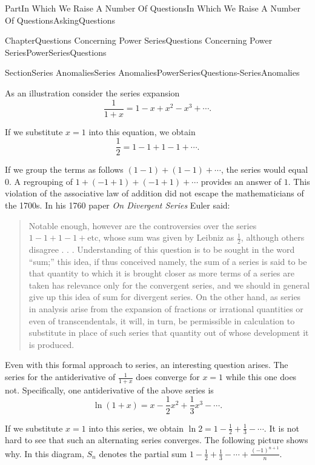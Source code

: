 \documentclass[oneside,10pt,]{book}
\newcommand{\pubtitle}[1]{\textsl{#1}}
\numberwithin{equation}{part}
\begin{document}
\begin{partptx}{Part}{In Which We Raise A Number Of Questions}{}{In Which We Raise A Number Of Questions}{}{}{AskingQuestions}
\begin{chapterptx}{Chapter}{Questions Concerning Power Series}{}{Questions Concerning Power Series}{}{}{PowerSeriesQuestions}
\begin{sectionptx}{Section}{Series Anomalies}{}{Series Anomalies}{}{}{PowerSeriesQuestions-SeriesAnomalies}
\par
As an illustration consider the series expansion%
\begin{equation*}
\frac{1}{1+x}=1-x+x^2-x^3+\cdots\text{.}
\end{equation*}
%
\par
If we substitute \(x=1\) into this equation, we obtain%
\begin{equation*}
\frac{1}{2}=1-1+1-1+\cdots\text{.}
\end{equation*}
%
\par
If we group the terms as follows \((1-1)+(1-1)+\cdots\), the series would equal \(0\).  A regrouping of \(1+(-1+1)+(-1+1)+\cdots\) provides an answer of \(1\). This violation of the associative law of addition did not escape the mathematicians of the 1700s.  In his 1760 paper \pubtitle{On Divergent Series} Euler said:%
\begin{quote}%
 Notable enough, however are the controversies over the series \(1-1+1-1+\text{etc}\), whose sum was given by Leibniz as \(\frac{1}{2}\), although others disagree . . . Understanding of this question is to be sought in the word ``sum;'' this idea, if thus conceived \textemdash{} namely, the sum of a series is said to be that quantity to which it is brought closer as more terms of a series are taken \textemdash{} has relevance only for the convergent series, and we should in general give up this idea of sum for divergent series.  On the other hand, as series in analysis arise from the expansion of fractions or irrational quantities or even of transcendentals, it will, in turn, be permissible in calculation to substitute in place of such series that quantity out of whose development it is produced.%
\end{quote}
Even with this formal approach to series, an interesting question arises.  The series for the antiderivative of \(\frac{1}{1+x}\) does converge for \(x=1\) while this one does not. Specifically, one antiderivative of the above series is%
\begin{equation*}
\ln(1+x)=x-\frac{1}{2}x^2+\frac{1}{3}x^3-\cdots\text{.}
\end{equation*}
%
\par
If we substitute \(x=1\) into this series, we obtain \(\ln
2=1-\frac{1}{2}+\frac{1}{3}-\cdots\).  It is not hard to see that such an alternating series converges.  The following picture shows why.  In this diagram, \(S_n\) denotes the partial sum \(1-\frac{1}{2}+\frac{1}{3}-\cdots+\frac{(-1)^{n+1}}{n}\).%
\begin{image}{0.05}{0.9}{0.05}{}%

\end{image}
\end{sectionptx}
\end{chapterptx}
\end{partptx}
\end{document}
